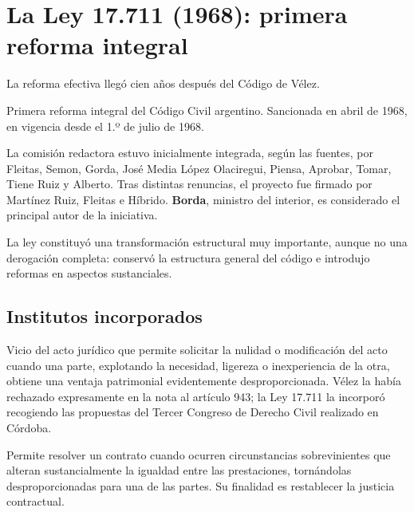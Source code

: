 \documentclass[12pt,oneside]{book}
\begin{document}
\section{La Ley 17.711 (1968): primera reforma integral}

La reforma efectiva llegó cien años después del Código de Vélez.

\begin{importante}[Ley 17.711 (1968)]
Primera reforma integral del Código Civil argentino. Sancionada en abril de 1968, en vigencia desde el 1.º de julio de 1968.
\end{importante}

La comisión redactora estuvo inicialmente integrada, según las fuentes, por Fleitas, Semon, Gorda, José Media López Olaciregui, Piensa, Aprobar, Tomar, Tiene Ruiz y Alberto. Tras distintas renuncias, el proyecto fue firmado por Martínez Ruiz, Fleitas e Híbrido. \textbf{Borda}, ministro del interior, es considerado el principal autor de la iniciativa.

La ley constituyó una transformación estructural muy importante, aunque no una derogación completa: conservó la estructura general del código e introdujo reformas en aspectos sustanciales.

\subsection{Institutos incorporados}

\begin{definicion}
Vicio del acto jurídico que permite solicitar la nulidad o modificación del acto cuando una parte, explotando la necesidad, ligereza o inexperiencia de la otra, obtiene una ventaja patrimonial evidentemente desproporcionada. Vélez la había rechazado expresamente en la nota al artículo 943; la Ley 17.711 la incorporó recogiendo las propuestas del Tercer Congreso de Derecho Civil realizado en Córdoba.
\end{definicion}

\begin{definicion}
Permite resolver un contrato cuando ocurren circunstancias sobrevinientes que alteran sustancialmente la igualdad entre las prestaciones, tornándolas desproporcionadas para una de las partes. Su finalidad es restablecer la justicia contractual.
\end{definicion}
\end{document}
